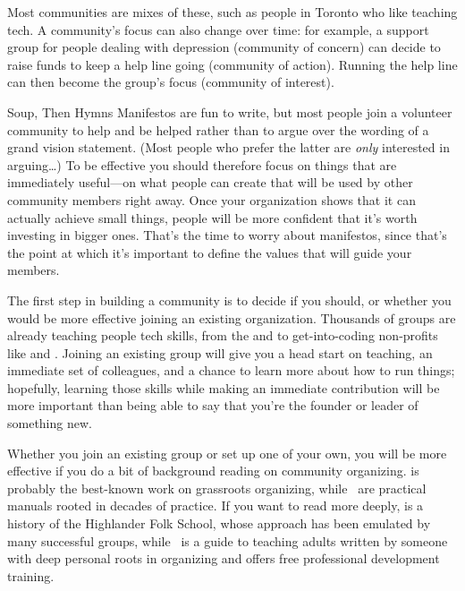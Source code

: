 Most communities are mixes of these,
such as people in Toronto who like teaching tech.
A community's focus can also change over time:
for example,
a support group for people dealing with depression (community of concern)
can decide to raise funds to keep a help line going (community of action).
Running the help line can then become the group's focus (community of interest).

\begin{aside}{Soup, Then Hymns}
  Manifestos are fun to write,
  but most people join a volunteer community to help and be helped
  rather than to argue over the wording of a grand vision statement.
  (Most people who prefer the latter are \emph{only} interested in arguing{\ldots})
  To be effective you should therefore focus on things that are immediately useful---on
  what people can create that will be used by other community members right away.
  Once your organization shows that it can actually achieve small things,
  people will be more confident that it's worth investing in bigger ones.
  That's the time to worry about manifestos,
  since that's   the point at which it's important to define the values
  that will guide your members.
\end{aside}


The first step in building a community is to decide if you should,
or whether you would be more effective joining an existing organization.
Thousands of groups are already teaching people tech skills,
from the 
and 
to get-into-coding non-profits like
and .
Joining an existing group will give you a head start on teaching,
an immediate set of colleagues,
and a chance to learn more about how to run things;
hopefully,
learning those skills while making an immediate contribution
will be more important than being able to say that
you're the founder or leader of something new.

Whether you join an existing group or set up one of your own,
you will be more effective if you do a bit of background reading on community organizing.
\cite{Alin1989,Lake2018} is probably the best-known work on grassroots organizing,
while~\cite{Brow2007,Midw2010,Lake2018} are practical manuals rooted in decades of practice.
If you want to read more deeply,
\cite{Adam1975} is a history of the Highlander Folk School,
whose approach has been emulated by many successful groups,
while~\cite{Spal2014} is a guide to teaching adults
written by someone with deep personal roots in organizing
and 
offers free professional development training.


